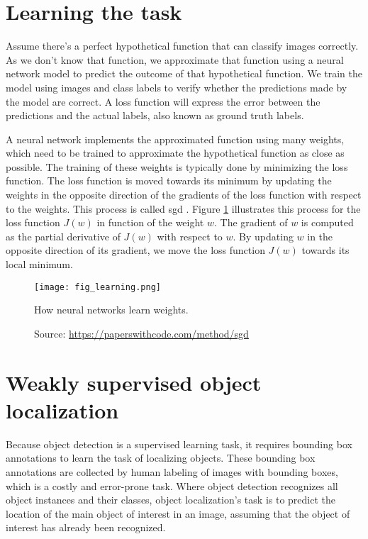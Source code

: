 \section{Learning the task}
Assume there's a perfect hypothetical function that can classify images correctly. As we don't know that function, we approximate that function using a neural network model to predict the outcome of that hypothetical function. We train the model using images and class labels to verify whether the predictions made by the model are correct. A loss function will express the error between the predictions and the actual labels, also known as ground truth labels.

A neural network implements the approximated function using many weights, which need to be trained to approximate the hypothetical function as close as possible. The training of these weights is typically done by minimizing the loss function. The loss function is moved towards its minimum by updating the weights in the opposite direction of the gradients of the loss function with respect to the weights. This process is called \acrfull{sgd} \cite{amari1993backpropagation}. Figure \ref{fig:learning} illustrates this process for the loss function $J(w)$ in function of the weight $w$. The gradient of $w$ is computed as the partial derivative of $J(w)$ with respect to $w$. By updating $w$ in the opposite direction of its gradient, we move the loss function $J(w)$ towards its local minimum.
\begin{figure}[ht]
    \begin{center}       
    \texttt{[image: fig\_learning.png]}
    \caption[How neural networks learn weights]{How neural networks learn weights.}
    \caption*{Source: \href{https://paperswithcode.com/method/sgd}{https://paperswithcode.com/method/sgd}}
    \label{fig:learning}
    \end{center}
\end{figure}

\section{Weakly supervised object localization}
Because object detection is a supervised learning task, it requires bounding box annotations to learn the task of localizing objects. These bounding box annotations are collected by human labeling of images with bounding boxes, which is a costly and error-prone task. Where object detection recognizes all object instances and their classes, object localization's task is to predict the location of the main object of interest in an image, assuming that the object of interest has already been recognized.

